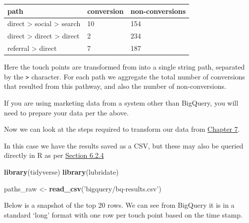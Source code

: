 \documentclass[]{book}
\newenvironment{Shaded}{\begin{snugshade}}{\end{snugshade}}
\newcommand{\KeywordTok}[1]{\textcolor[rgb]{0.13,0.29,0.53}{\textbf{#1}}}
\newcommand{\StringTok}[1]{\textcolor[rgb]{0.31,0.60,0.02}{#1}}
\newcommand{\NormalTok}[1]{#1}
\begin{document}
\begin{longtable}[]{@{}lll@{}}
\toprule
path & conversion & non-conversions\tabularnewline
\midrule
\endhead
direct \textgreater{} social \textgreater{} search & 10 &
154\tabularnewline
direct \textgreater{} direct \textgreater{} direct & 2 &
234\tabularnewline
referral \textgreater{} direct & 7 & 187\tabularnewline
\bottomrule
\end{longtable}

Here the touch points are transformed from into a single string path,
separated by the \texttt{\textgreater{}} character. For each path we
aggregate the total number of conversions that resulted from this
pathway, and also the number of non-conversions.

If you are using marketing data from a system other than BigQuery, you
will need to prepare your data per the above.

Now we can look at the steps required to transform our data from
\protect\hyperlink{about-the-data}{Chapter 7}.

In this case we have the results saved as a CSV, but these may also be
queried directly in R as per
\protect\hyperlink{using-r-with-bigquery}{Section 6.2.4}

\begin{Shaded}
\begin{Highlighting}[]
\KeywordTok{library}\NormalTok{(tidyverse)}
\KeywordTok{library}\NormalTok{(lubridate)}

\NormalTok{paths_raw <-}\StringTok{ }\KeywordTok{read_csv}\NormalTok{(}\StringTok{'bigquery/bq-results.csv'}\NormalTok{)}
\end{Highlighting}
\end{Shaded}

Below is a snapshot of the top 20 rows. We can see from BigQuery it is
in a standard `long' format with one row per touch point based on the
time stamp.
\end{document}
